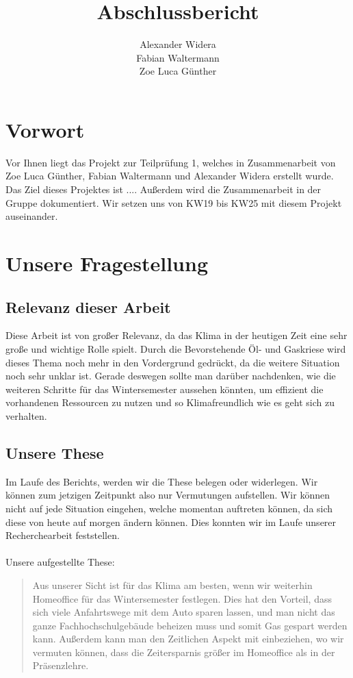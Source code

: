 \documentclass[a4paper,12pt]{scrartcl}
\title {\textbf{Abschlussbericht}}
\author{Alexander Widera \\ Fabian Waltermann \\ Zoe Luca Günther}
\begin{document}
\maketitle
\newpage
\tableofcontents
\newpage
{}

\section{Vorwort}
Vor Ihnen liegt das Projekt zur Teilprüfung 1, welches in Zusammenarbeit von Zoe
Luca Günther, Fabian Waltermann und Alexander Widera erstellt wurde. Das Ziel dieses
Projektes ist .... Außerdem wird die Zusammenarbeit in der Gruppe dokumentiert.
Wir setzen uns von KW19 bis KW25 mit diesem Projekt auseinander.

\section{Unsere Fragestellung}
\subsection{Relevanz dieser Arbeit}
Diese Arbeit ist von großer Relevanz, da das Klima in der heutigen Zeit eine sehr große und wichtige Rolle spielt. Durch die Bevorstehende Öl- und Gaskriese wird dieses Thema noch mehr in den Vordergrund gedrückt, da die weitere Situation noch sehr unklar ist. Gerade deswegen sollte man darüber nachdenken, wie die weiteren Schritte für das Wintersemester aussehen könnten, um effizient die vorhandenen Ressourcen zu nutzen und so Klimafreundlich wie es geht sich zu verhalten.

\subsection{Unsere These}
Im Laufe des Berichts, werden wir die These belegen oder widerlegen. Wir können zum jetzigen Zeitpunkt also nur Vermutungen aufstellen. Wir können nicht auf jede Situation eingehen, welche momentan auftreten können, da sich diese von heute auf morgen ändern können. Dies konnten wir im Laufe unserer Recherchearbeit feststellen.\\\\

Unsere aufgestellte These:\\
\blockquote{Aus unserer Sicht ist für das Klima am besten, wenn wir weiterhin Homeoffice für das Wintersemester festlegen. Dies hat den Vorteil, dass sich viele Anfahrtswege mit dem Auto sparen lassen, und man nicht das ganze Fachhochschulgebäude beheizen muss und somit Gas gespart werden kann. Außerdem kann man den Zeitlichen Aspekt mit einbeziehen, wo wir vermuten können, dass die Zeitersparnis größer im Homeoffice als in der Präsenzlehre.}
\end{document}
